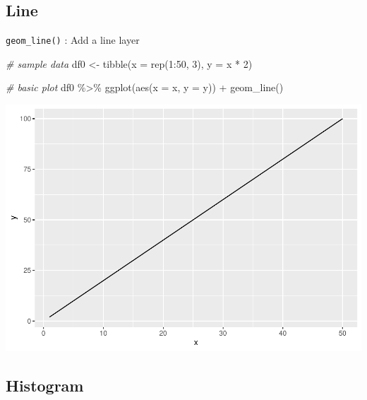 \documentclass[
]{book}
\newenvironment{Shaded}{\begin{snugshade}}{\end{snugshade}}
\newcommand{\AttributeTok}[1]{\textcolor[rgb]{0.77,0.63,0.00}{#1}}
\newcommand{\CommentTok}[1]{\textcolor[rgb]{0.56,0.35,0.01}{\textit{#1}}}
\newcommand{\DecValTok}[1]{\textcolor[rgb]{0.00,0.00,0.81}{#1}}
\newcommand{\FunctionTok}[1]{\textcolor[rgb]{0.00,0.00,0.00}{#1}}
\newcommand{\NormalTok}[1]{#1}
\newcommand{\OtherTok}[1]{\textcolor[rgb]{0.56,0.35,0.01}{#1}}
\newcommand{\SpecialCharTok}[1]{\textcolor[rgb]{0.00,0.00,0.00}{#1}}
\begin{document}
\hypertarget{line}{%
\subsection{Line}\label{line}}

\texttt{geom\_line()} : Add a line layer

\begin{Shaded}
\begin{Highlighting}[]
\CommentTok{\# sample data}
\NormalTok{df0 }\OtherTok{\textless{}{-}} \FunctionTok{tibble}\NormalTok{(}\AttributeTok{x =} \FunctionTok{rep}\NormalTok{(}\DecValTok{1}\SpecialCharTok{:}\DecValTok{50}\NormalTok{, }\DecValTok{3}\NormalTok{),}
              \AttributeTok{y =}\NormalTok{ x }\SpecialCharTok{*} \DecValTok{2}\NormalTok{)}

\CommentTok{\# basic plot}
\NormalTok{df0 }\SpecialCharTok{\%\textgreater{}\%} 
  \FunctionTok{ggplot}\NormalTok{(}\FunctionTok{aes}\NormalTok{(}\AttributeTok{x =}\NormalTok{ x,}
             \AttributeTok{y =}\NormalTok{ y)) }\SpecialCharTok{+}
  \FunctionTok{geom\_line}\NormalTok{()}
\end{Highlighting}
\end{Shaded}

\begin{center}\includegraphics{_main_files/figure-latex/unnamed-chunk-112-1} \end{center}

\hypertarget{histogram}{%
\subsection{Histogram}\label{histogram}}
\end{document}
